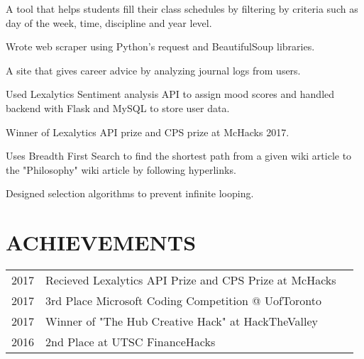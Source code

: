 \documentclass[]{deedy-resume-openfont}
\begin{document}
\begin{minipage}[t]{0.66\textwidth}
\begin{tightemize}
\item A tool that helps students fill their class schedules by filtering by criteria such as day of the week, time, discipline and year level.
\item Wrote web scraper using Python's request and BeautifulSoup libraries.
\end{tightemize}
\sectionsep

\begin{tightemize}
\item A site that gives career advice by analyzing journal logs from users.
\item Used Lexalytics Sentiment analysis API to assign mood scores and handled backend with Flask and MySQL to store user data.
\item Winner of Lexalytics API prize and CPS prize at McHacks 2017.
\end{tightemize}
\sectionsep

\begin{tightemize}
\item Uses Breadth First Search to find the shortest path from a given wiki article to the "Philosophy" wiki article by following hyperlinks. 
\item Designed selection algorithms to prevent infinite looping.
\end{tightemize}
\sectionsep


\section{ACHIEVEMENTS} 
\begin{tabular}{rll}
2017	     & Recieved Lexalytics API Prize and CPS Prize at McHacks\\
2017	     & 3rd Place Microsoft Coding Competition @ UofToronto\\
2017     & Winner of "The Hub Creative Hack" at HackTheValley \\
2016	     & 2nd Place at UTSC FinanceHacks\\

\end{tabular}
\sectionsep

\end{minipage} 
\end{document}
